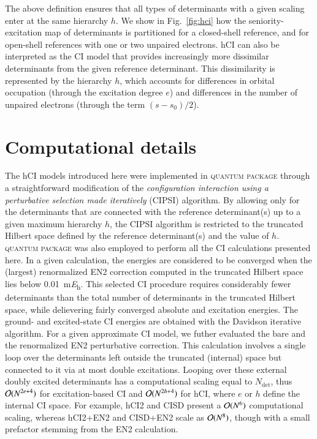 \documentclass[aip,jcp,reprint,noshowkeys,superscriptaddress]{revtex4-1}
\newcommand{\QP}{\textsc{quantum package}}
\newcommand{\Ndet}{N_\text{det}}
\begin{document}
The above definition ensures that all types of determinants with a given scaling enter at the same hierarchy $h$.
We show in Fig.~\ref{fig:hci} how the seniority-excitation map of determinants is partitioned for a closed-shell reference, and for open-shell references with one or two unpaired electrons.
hCI can also be interpreted as the CI model that provides increasingly more dissimilar determinants from the given reference determinant.
This dissimilarity is represented by the hierarchy $h$, which accounts for differences in orbital occupation (through the excitation degree $e$)
and differences in the number of unpaired electrons (through the term $(s-s_0)/2$).
 



\section{Computational details}
\label{sec:compdet}

The hCI models introduced here were implemented in {\QP} \cite{Garniron_2019} through a straightforward modification of the
\textit{configuration interaction using a perturbative selection made iteratively} (CIPSI) algorithm. \cite{Huron_1973,Giner_2013,Giner_2015,Garniron_2018}
By allowing only for the determinants that are connected with the reference determinant(s) up to a given maximum hierarchy $h$,
the CIPSI algorithm is restricted to the truncated Hilbert space defined by the reference determinant(s) and the value of $h$.
{\QP} \cite{Garniron_2019} was also employed to perform all the CI calculations presented here.
In a given calculation, the energies are considered to be converged when the (largest) renormalized EN2 correction computed in the truncated Hilbert space 
lies below \SI{0.01}{\milli\hartree}. \cite{Garniron_2018}
This selected CI procedure requires considerably fewer determinants than the total number of determinants in the truncated Hilbert space,
while delievering fairly converged absolute and excitation energies.
The ground- and excited-state CI energies are obtained with the Davidson iterative algorithm. \cite{Davidson_1975}
For a given approximate CI model, we futher evaluated the bare and the renormalized EN2 perturbative correction. \cite{Garniron_2019} 
This calculation involves a single loop over the determinants left outside the truncated (internal) space but connected to it via at most double excitations.
Looping over these external doubly excited determinants has a computational scaling equal to $\Ndet$,
thus $\order*{N^{2e+4}}$ for excitation-based CI and $\order*{N^{2h+4}}$ for hCI, where $e$ or $h$ define the internal CI space.
For example, hCI2 and CISD present a $\order*{N^6}$ computational scaling, whereas hCI2+EN2 and CISD+EN2 scale as $\order*{N^8}$,
though with a small prefactor stemming from the EN2 calculation.
\end{document}
